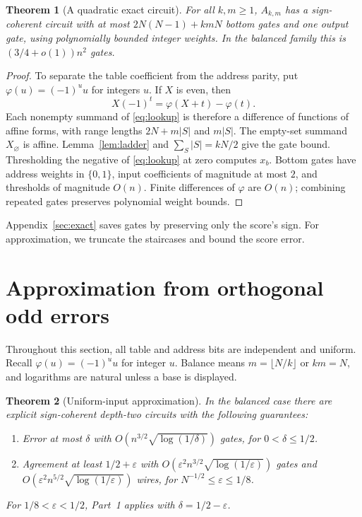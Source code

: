 \documentclass[11pt]{article}
\newtheorem{theorem}{Theorem}[section]
\begin{document}
\begin{theorem}[A quadratic exact circuit]\label{thm:simple}
For all $k,m\ge1$, $A_{k,m}$ has a sign-coherent circuit with at most
$2N(N-1)+kmN$ bottom gates and one output gate, using polynomially
bounded integer weights. In the balanced family this is
$(3/4+o(1))n^2$ gates.
\end{theorem}
\begin{proof}
To separate the table coefficient from the address parity, put
$\varphi(u)=(-1)^u u$ for integers $u$. If $X$ is even, then
$$X(-1)^t=\varphi(X+t)-\varphi(t).$$
Each nonempty summand of \eqref{eq:lookup} is therefore a difference
of functions of affine forms, with range lengths $2N+m|S|$ and $m|S|$.
The empty-set summand $X_\varnothing$ is affine. Lemma~\ref{lem:ladder}
and $\sum_S|S|=kN/2$ give the gate bound.
Thresholding the negative of \eqref{eq:lookup} at zero computes $x_b$.
Bottom gates have address weights in $\{0,1\}$, input coefficients
of magnitude at most $2$, and thresholds of magnitude $O(n)$.
Finite differences of $\varphi$ are $O(n)$; combining repeated gates
preserves polynomial weight bounds.
\end{proof}

Appendix~\ref{sec:exact} saves gates by preserving only the score's sign.
For approximation, we truncate the staircases and bound the score error.

\section{Approximation from orthogonal odd errors}\label{sec:approx}
Throughout this section, all table and address bits are independent and
uniform. Recall $\varphi(u)=(-1)^u u$ for integer $u$. Balance means
$m=\lfloor N/k\rfloor$ or $km=N$, and logarithms are natural unless a
base is displayed.

\begin{theorem}[Uniform-input approximation]\label{thm:avgupper}
In the balanced case there are explicit sign-coherent depth-two circuits
with the following guarantees:
\begin{enumerate}
\item Error at most $\delta$ with
 $O(n^{3/2}\sqrt{\log(1/\delta)})$ gates, for $0<\delta\le1/2$.
\item Agreement at least $1/2+\varepsilon$ with
 $O(\varepsilon^2n^{3/2}\sqrt{\log(1/\varepsilon)})$ gates and
 $O(\varepsilon^2n^{5/2}\sqrt{\log(1/\varepsilon)})$ wires, for
 $N^{-1/2}\le\varepsilon\le1/8$.
\end{enumerate}
For $1/8<\varepsilon<1/2$, Part~1 applies with $\delta=1/2-\varepsilon$.
\end{theorem}
\end{document}
